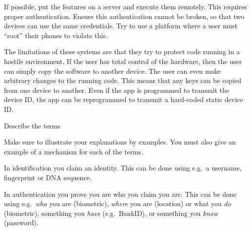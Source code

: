 \documentclass[svv,addpoints]{miunexam}
\begin{document}
\begin{questions}

  \begin{solution}
    If possible, put the features on a server and execute them remotely.
    This requires proper authentication.
    Ensure this authentication cannot be broken, so that two devices can use 
    the same credentials.
    Try to use a platform where a user must \enquote{root} their phones to 
    violate this.

    The limitations of these systems are that they try to protect code running 
    in a hostile environment.
    If the user has total control of the hardware, then the user can simply 
    copy the software to another device.
    The user can even make arbitrary changes to the running code.
    This means that any keys can be copied from one device to another.
    Even if the app is programmed to transmit the device ID, the app can be 
    reprogrammed to transmit a hard-coded static device ID\@.
  \end{solution}


\question\label{q:auth:E:C}
  Describe the terms
  Make sure to illustrate your explanations by examples.
  You must also give an example of a mechanism for each of the terms.

  \begin{solution}
    In identification you claim an identity.
    This can be done using e.g.~a username, fingerprint or DNA sequence.

    In authentication you prove you are who you claim you are.
    This can be done using e.g.~\emph{who} you are (biometric), \emph{where} 
    you are (location) or what you \emph{do} (biometric), something you 
    \emph{have} (e.g.~BankID), or something you \emph{know} (password).
  \end{solution}



\end{questions}
\end{document}
